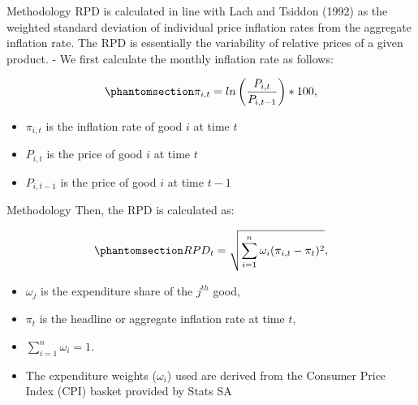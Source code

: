 \documentclass[
  ignorenonframetext,
]{beamer}
\providecommand{\tightlist}{%
  \setlength{\itemsep}{0pt}\setlength{\parskip}{0pt}}\usepackage{longtable,booktabs,array}
\begin{document}
\begin{frame}{Methodology}
\label{methodology}
RPD is calculated in line with Lach and Tsiddon (1992) as the weighted
standard deviation of individual price inflation rates from the
aggregate inflation rate. The RPD is essentially the variability of
relative prices of a given product. - We first calculate the monthly
inflation rate as follows:

\begin{equation}\phantomsection\label{eq-inflation_rate}{ \pi_{i,t} = ln\left(\frac{P_{i,t}}{P_{i,t-1}}\right) * 100, }\end{equation}

\begin{itemize}
\tightlist
\item
  \(\pi_{i,t}\) is the inflation rate of good \(i\) at time \(t\)
\item
  \(P_{i,t}\) is the price of good \(i\) at time \(t\)
\item
  \(P_{i,t-1}\) is the price of good \(i\) at time \(t-1\)
\end{itemize}
\end{frame}

\begin{frame}{Methodology}
\label{methodology-1}
Then, the RPD is calculated as:

\begin{equation}\phantomsection\label{eq-rpd}{RPD_{t} = \sqrt{\sum_{i=1}^{n}\omega_{i}(\pi_{i,t} - \pi_{t})^2}, }\end{equation}

\begin{itemize}
\tightlist
\item
  \(\omega_{j}\) is the expenditure share of the \(j^{th}\) good,
\item
  \(\pi_{t}\) is the headline or aggregate inflation rate at time \(t\),
\item
  \(\sum_{i=1}^{n}\omega_{i} = 1\).
\item
  The expenditure weights (\(\omega_{i}\)) used are derived from the
  Consumer Price Index (CPI) basket provided by Stats SA
\end{itemize}
\end{frame}
\end{document}
